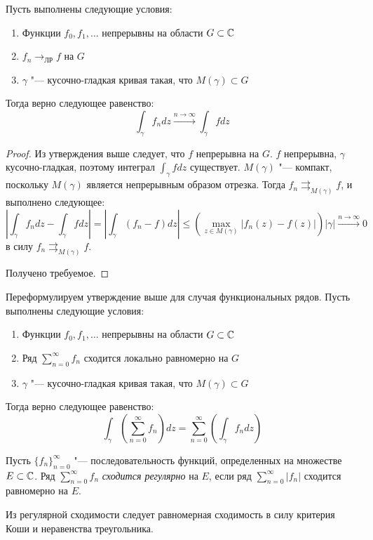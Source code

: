 \begin{unnecessary}
    \begin{proposition}
    	Пусть выполнены следующие условия:
    	\begin{enumerate}
    		\item Функции $f_0, f_1, \dotsc$ непрерывны на области $G \subset \mathbb{C}$
    		\item $f_n \rightarrow_{\text{ЛР}} f$ на $G$
    		\item $\gamma$ "--- кусочно-гладкая кривая такая, что $M(\gamma) \subset G$
    	\end{enumerate}
    	
    	Тогда верно следующее равенство:
    	\[\int_\gamma f_ndz \xrightarrow{n \to \infty} \int_\gamma fdz\]
    \end{proposition}
    
    \begin{proof}
    	Из утверждения выше следует, что $f$ непрерывна на $G$. $f$ непрерывна, $\gamma$ кусочно-гладкая, поэтому интеграл $\int_\gamma fdz$ существует. $M(\gamma)$ "--- компакт, поскольку $M(\gamma)$ является непрерывным образом отрезка. Тогда $f_n \rightrightarrows_{M(\gamma)} f$, и выполнено следующее:
    	\[\left|\int_\gamma f_ndz - \int_\gamma fdz\right| = \left|\int_\gamma (f_n - f)dz\right| \le \left(\max_{z \in M(\gamma)}|f_n(z) - f(z)|\right)|\gamma| \xrightarrow{n \to \infty} 0\]
    	в силу $f_n \rightrightarrows_{M(\gamma)} f$.
     
    	Получено требуемое.
    \end{proof}
    
    \begin{note}
    	Переформулируем утверждение выше для случая функциональных рядов. Пусть выполнены следующие условия:
    	\begin{enumerate}
    		\item Функции $f_0, f_1, \dotsc$ непрерывны на области $G \subset \mathbb{C}$
    		\item Ряд $\sum_{n=0}^\infty f_n$ сходится локально равномерно на $G$
    		\item $\gamma$ "--- кусочно-гладкая кривая такая, что $M(\gamma) \subset G$
    	\end{enumerate}
    	
    	Тогда верно следующее равенство:
    	\[\int_\gamma \left(\sum_{n=0}^\infty f_n\right)dz = \sum_{n=0}^\infty \left(\int_\gamma f_ndz\right)\]
    \end{note}
    
    \begin{definition}
    	Пусть $\{f_n\}_{n = 0}^\infty$ "--- последовательность функций, определенных на множестве $E \subset \mathbb{C}$. Ряд $\sum_{n=0}^\infty f_n$ \textit{сходится регулярно} на $E$, если ряд $\sum_{n=0}^\infty |f_n|$ сходится равномерно на $E$.
    \end{definition}
    
    \begin{note}
    	Из регулярной сходимости следует равномерная сходимость в силу критерия Коши и неравенства треугольника.
    \end{note}
\end{unnecessary}


